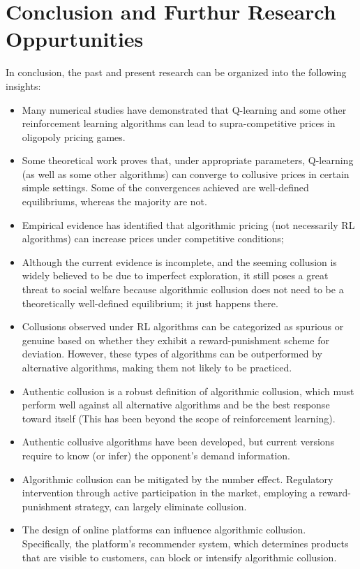 \documentclass[mnsc,nonblindrev]{workingpaper}
\begin{document}
\section{Conclusion and Furthur Research Oppurtunities}
\label{sec:conclusion}

In conclusion, the past and present research can be organized into the following insights:

\begin{itemize}
\setlength{\itemsep}{0.45em}
    \item Many numerical studies have demonstrated that Q-learning and some other reinforcement learning algorithms can lead to supra-competitive prices in oligopoly pricing games.
    \item Some theoretical work proves that, under appropriate parameters, Q-learning (as well as some other algorithms) can converge to collusive prices in certain simple settings. Some of the convergences achieved are well-defined equilibriums, whereas the majority are not.
    \item Empirical evidence has identified that algorithmic pricing (not necessarily RL algorithms) can increase prices under competitive conditions;
    \item Although the current evidence is incomplete, and the seeming collusion is widely believed to be due to imperfect exploration, it still poses a great threat to social welfare because algorithmic collusion does not need to be a theoretically well-defined equilibrium; it just happens there.
    \item Collusions observed under RL algorithms can be categorized as spurious or genuine based on whether they exhibit a reward-punishment scheme for deviation. However, these types of algorithms can be outperformed by alternative algorithms, making them not likely to be practiced.
    \item Authentic collusion is a robust definition of algorithmic collusion, which must perform well against all alternative algorithms and be the best response toward itself (This has been beyond the scope of reinforcement learning). 
    \item Authentic collusive algorithms have been developed, but current versions require to know (or infer) the opponent's demand information. 
    \item Algorithmic collusion can be mitigated by the number effect. Regulatory intervention through active participation in the market, employing a reward-punishment strategy, can largely eliminate collusion.
    \item The design of online platforms can influence algorithmic collusion. Specifically, the platform's recommender system, which determines products that are visible to customers, can block or intensify algorithmic collusion.
\end{itemize}
\end{document}
